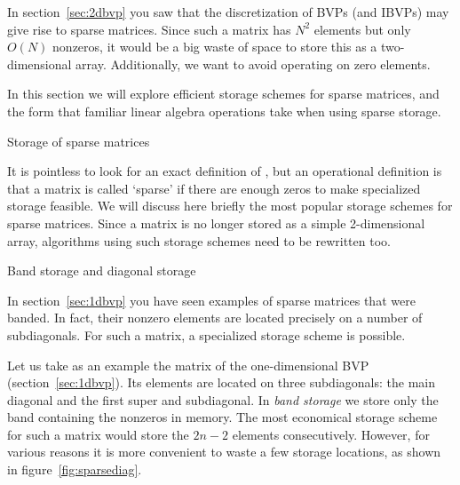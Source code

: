 
In section~\ref{sec:2dbvp} you saw that the discretization of
\ac{BVP}s (and \ac{IBVP}s) may give rise to sparse matrices.
Since such a matrix has $N^2$ elements but only $O(N)$
nonzeros, it would be a big waste of space to store this as a two-dimensional
array. Additionally, we want to avoid operating on zero elements.

In this section we will explore efficient storage schemes for sparse
matrices, and the form that familiar linear algebra operations take
when using sparse storage.

 {Storage of sparse matrices}
\label{sec:sparse-storage}


It is pointless to look for an exact definition of
, but an operational definition is that a
matrix is called `sparse' if there are enough zeros to make
specialized storage feasible. We will discuss here briefly the most
popular storage schemes for sparse matrices.
Since a matrix is no longer stored as a simple 2-dimensional array,
algorithms using such storage schemes need to be rewritten too. 

 {Band storage and diagonal storage}
\label{sec:diagonal-storage}
\label{sec:band-storage}

In section~\ref{sec:1dbvp} you have seen examples of sparse matrices
that were banded. In fact, their nonzero elements are located
precisely on a number of subdiagonals. For such a matrix, a
specialized storage scheme is possible.

Let us take as an example the matrix of the one-dimensional \ac{BVP}
(section~\ref{sec:1dbvp}). Its elements are located on three
subdiagonals: the main diagonal and the first super and
subdiagonal. In
\emph{band storage}
we store only the band containing the nonzeros
in memory. The most economical storage scheme for such a matrix would
store the $2n-2$ elements consecutively. However, for various reasons
it is more convenient to waste a few storage locations, as shown in
figure~\ref{fig:sparsediag}.

